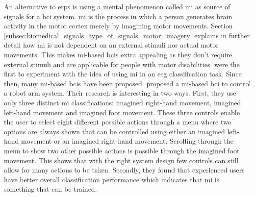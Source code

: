 An alternative to \glspl{erp} is using a mental phenomenon called \gls{mi} as source of signals for a \gls{bci} system.
\Gls{mi} is the process in which a person generates brain activity in the motor cortex merely by imagining motor movements.
Section \ref{subsec:biomedical_signals_type_of_signals_motor_imagery} explains in further detail how \gls{mi} is not dependent on an external stimuli nor actual motor movements.
This makes \gls{mi}-based \glspl{bci} extra appealing as they don't require external stimuli and are applicable for people with motor disabilities.
 were the first to experiment with the idea of using \gls{mi} in an \gls{eeg} classification task.
Since then, many \gls{mi}-based \glspl{bci} have been proposed.
 proposed a \gls{mi}-based \gls{bci} to control a robot arm system.
Their research is interesting in two ways.
First, they use only three distinct \gls{mi} classifications: imagined right-hand movement, imagined left-hand movement and imagined foot movement.
These three controls enable the user to select eight different possible actions through a menu where two options are always shown that can be controlled using either an imagined left-hand movement or an imagined right-hand movement.
Scrolling through the menu to show two other possible actions is possible through the imagined foot movement.
This shows that with the right system design few controls can still allow for many actions to be taken.
Secondly, they found that experienced users have better overall classification performance which indicates that \gls{mi} is something that can be trained.

